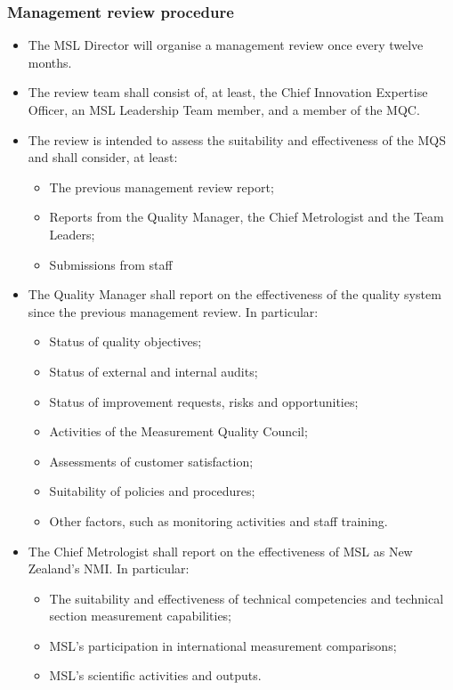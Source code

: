 \subsubsection{Management review procedure}
\begin{itemize}
\item The MSL Director will organise a management review once every twelve months. 
\item The review team shall consist of, at least, the Chief Innovation Expertise Officer, an MSL Leadership Team member, and a member of the MQC.
\item The review is intended to assess the suitability and effectiveness of the MQS and shall consider, at least:
\begin{itemize}
\item The previous management review report;
\item Reports from the Quality Manager, the Chief Metrologist and the Team Leaders; 
\item Submissions from staff
\end{itemize}
\item The Quality Manager shall report on the effectiveness of the quality system since the previous management review. In particular:
\begin{itemize}
\item Status of quality objectives;
\item Status of external and internal audits;
\item Status of improvement requests, risks and opportunities;
\item Activities of the Measurement Quality Council;
\item Assessments of customer satisfaction;
\item Suitability of policies and procedures;
\item Other factors, such as monitoring activities and staff training.
\end{itemize}
\item The Chief Metrologist shall report on the effectiveness of MSL as New Zealand’s NMI. In particular:
\begin{itemize}
\item The suitability and effectiveness of technical competencies and technical section measurement capabilities;
\item MSL’s participation in international measurement comparisons;
\item MSL’s scientific activities and outputs.
\end{itemize}

\end{itemize}
